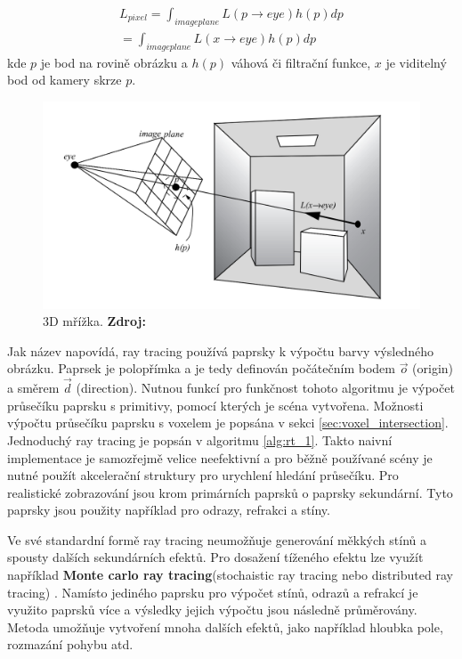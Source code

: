 \begin{equation} \label{eq:rt_1}
	\begin{gathered}
		L_{pixel} = \int_{imageplane}L(p \xrightarrow{} eye)h(p)dp \\= \int_{imageplane}L(x \xrightarrow{} eye)h(p)dp
	\end{gathered}
\end{equation}
kde $p$ je bod na rovině obrázku a $h(p)$ váhová či filtrační funkce, $x$ je viditelný bod od kamery skrze $p$.

\begin{figure}[H]
	\centering
	\includegraphics[scale=1]{obrazky-figures/ray_tracing_plane.png}
	\caption{3D mřížka. \textbf{Zdroj: \cite{advanced_global}}}
	\label{fig:3d_grid}
\end{figure}


Jak název napovídá, ray tracing používá paprsky k výpočtu barvy výsledného obrázku. Paprsek je polopřímka a je tedy definován počátečním bodem $\Vec{o}$ (origin) a směrem $\Vec{d}$ (direction). Nutnou funkcí pro funkčnost tohoto algoritmu je výpočet průsečíku paprsku s primitivy, pomocí kterých je scéna vytvořena. Možnosti výpočtu průsečíku paprsku s voxelem je popsána v sekci \ref{sec:voxel_intersection}. Jednoduchý ray tracing je popsán v algoritmu \ref{alg:rt_1}. Takto naivní implementace je samozřejmě velice neefektivní a pro běžně používané scény je nutné použít akcelerační struktury pro urychlení hledání průsečíku\cite{accelerated_rt}. Pro realistické zobrazování jsou krom primárních paprsků o paprsky sekundární. Tyto paprsky jsou použity například pro odrazy, refrakci a stíny.

Ve své standardní formě ray tracing neumožňuje generování měkkých stínů a spousty dalších sekundárních efektů.  Pro dosažení tíženého efektu lze využít například \textbf{Monte carlo ray tracing}(stochaistic ray tracing nebo distributed ray tracing) \cite{distributed_rt}. Namísto jediného paprsku pro výpočet stínů, odrazů a refrakcí je využito paprsků více a výsledky jejich výpočtu jsou následně průměrovány. Metoda umožňuje vytvoření mnoha dalších efektů, jako například hloubka pole, rozmazání pohybu atd.


